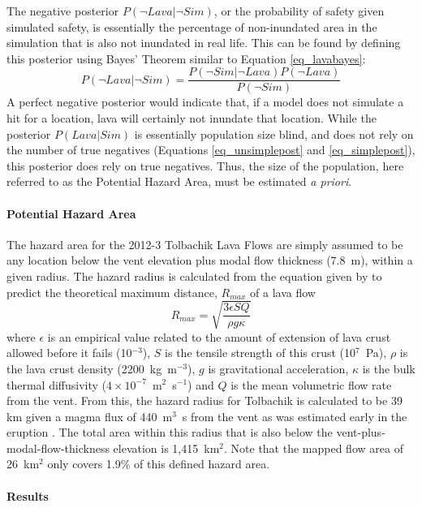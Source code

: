 \documentclass[12pt,letter]{article}
\begin{document}
		The negative posterior $P(\neg Lava|\neg Sim)$, or the probability of safety given simulated safety, is essentially the percentage of non-inundated area in the simulation that is also not inundated in real life. This can be found by defining this posterior using Bayes' Theorem similar to Equation \ref{eq_lavabayes}:
		\begin{equation}
		P(\neg Lava|\neg Sim)=\frac{P(\neg Sim|\neg Lava)P(\neg Lava)}{P(\neg Sim)}
		\end{equation}
		A perfect negative posterior would indicate that, if a model does not simulate a hit for a location, lava will certainly not inundate that location. While the posterior $P(Lava|Sim)$ is essentially population size blind, and does not rely on the number of true negatives (Equations \ref{eq_unsimplepost} and \ref{eq_simplepost}), this posterior does rely on true negatives. Thus, the size of the population, here referred to as the Potential Hazard Area, must be estimated \textit{a priori}.

		\paragraph{Potential Hazard Area} The hazard area for the 2012-3 Tolbachik Lava Flows are simply assumed to be any location below the vent elevation plus modal flow thickness (7.8~m), within a given radius. The hazard radius is calculated from the equation given by \citet{kilburn2000lava} to predict the theoretical maximum distance, $R_{max}$ of a lava flow
		\begin{equation}
		R_{max}=\sqrt{\frac{3\epsilon SQ}{\rho g\kappa}}
		\end{equation}
		where $\epsilon$ is an empirical value related to the amount of extension of lava crust allowed before it fails (10$^{-3}$), $S$ is the tensile strength of this crust (10$^7$~Pa), $\rho$ is the lava crust density (2200~kg~m$^{-3}$), $g$ is gravitational acceleration, $\kappa$ is the bulk thermal diffusivity ($4\times 10^{-7}$~m$^{2}$~s$^{-1}$) and $Q$ is the mean volumetric flow rate from the vent. From this, the hazard radius for Tolbachik is calculated to be 39 km given a magma flux of 440~m$^3$~s from the vent as was estimated early in the eruption \citep{belousov2015overview}. The total area within this radius that is also below the vent-plus-modal-flow-thickness elevation is 1,415~km$^2$. Note that the mapped flow area of 26~km$^2$ only covers 1.9\% of this defined hazard area.

		\paragraph{Results}
\end{document}
